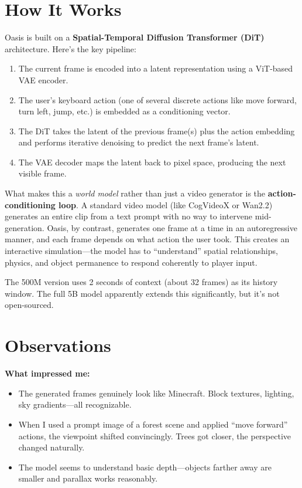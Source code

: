 \documentclass[11pt,a4paper]{article}
\begin{document}
\section{How It Works}

Oasis is built on a \textbf{Spatial-Temporal Diffusion Transformer (DiT)} architecture. Here's the key pipeline:

\begin{enumerate}[nosep]
    \item The current frame is encoded into a latent representation using a ViT-based VAE encoder.
    \item The user's keyboard action (one of several discrete actions like move forward, turn left, jump, etc.) is embedded as a conditioning vector.
    \item The DiT takes the latent of the previous frame(s) plus the action embedding and performs iterative denoising to predict the next frame's latent.
    \item The VAE decoder maps the latent back to pixel space, producing the next visible frame.
\end{enumerate}

What makes this a \textit{world model} rather than just a video generator is the \textbf{action-conditioning loop}. A standard video model (like CogVideoX or Wan2.2) generates an entire clip from a text prompt with no way to intervene mid-generation. Oasis, by contrast, generates one frame at a time in an autoregressive manner, and each frame depends on what action the user took. This creates an interactive simulation---the model has to ``understand'' spatial relationships, physics, and object permanence to respond coherently to player input.

The 500M version uses 2 seconds of context (about 32 frames) as its history window. The full 5B model apparently extends this significantly, but it's not open-sourced.

\section{Observations}

\textbf{What impressed me:}
\begin{itemize}[nosep]
    \item The generated frames genuinely look like Minecraft. Block textures, lighting, sky gradients---all recognizable.
    \item When I used a prompt image of a forest scene and applied ``move forward'' actions, the viewpoint shifted convincingly. Trees got closer, the perspective changed naturally.
    \item The model seems to understand basic depth---objects farther away are smaller and parallax works reasonably.
\end{itemize}
\end{document}

